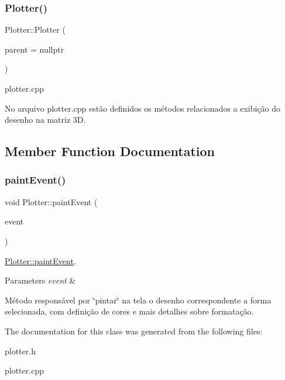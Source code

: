 \subsubsection{\texorpdfstring{Plotter()}{Plotter()}}
{\footnotesize\ttfamily Plotter\+::\+Plotter (\begin{DoxyParamCaption}\item[{Q\+Widget $\ast$}]{parent = {\ttfamily nullptr} }\end{DoxyParamCaption})\hspace{0.3cm}{\ttfamily [explicit]}}



plotter.\+cpp 

No arquivo plotter.\+cpp estão definidos os métodos relacionados a exibição do desenho na matriz 3D. 

\subsection{Member Function Documentation}
\mbox{\label{classPlotter_a06477bf987646f000a8982db1352a11d}} 
\subsubsection{\texorpdfstring{paintEvent()}{paintEvent()}}
{\footnotesize\ttfamily void Plotter\+::paint\+Event (\begin{DoxyParamCaption}\item[{Q\+Paint\+Event $\ast$}]{event }\end{DoxyParamCaption})}



\mbox{\hyperlink{classPlotter_a06477bf987646f000a8982db1352a11d}{Plotter\+::paint\+Event}}. 


\begin{DoxyParams}{Parameters}
{\em event} & \\
\hline
\end{DoxyParams}
Método responsável por \char`\"{}pintar\char`\"{} na tela o desenho correspondente a forma selecionada, com definição de cores e mais detalhes sobre formatação. 

The documentation for this class was generated from the following files\+:\begin{DoxyCompactItemize}
\item 
plotter.\+h\item 
plotter.\+cpp\end{DoxyCompactItemize}
